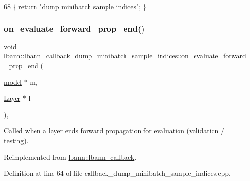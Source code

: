 \begin{DoxyCode}
68 \{ \textcolor{keywordflow}{return} \textcolor{stringliteral}{"dump minibatch sample indices"}; \}
\end{DoxyCode}
\mbox{\label{classlbann_1_1lbann__callback__dump__minibatch__sample__indices_acb641b979a37cc703994103a4e8428a5}} 
\subsubsection{\texorpdfstring{on\+\_\+evaluate\+\_\+forward\+\_\+prop\+\_\+end()}{on\_evaluate\_forward\_prop\_end()}}
{\footnotesize\ttfamily void lbann\+::lbann\+\_\+callback\+\_\+dump\+\_\+minibatch\+\_\+sample\+\_\+indices\+::on\+\_\+evaluate\+\_\+forward\+\_\+prop\+\_\+end (\begin{DoxyParamCaption}\item[{\hyperlink{classlbann_1_1model}{model} $\ast$}]{m,  }\item[{\hyperlink{classlbann_1_1Layer}{Layer} $\ast$}]{l }\end{DoxyParamCaption})\hspace{0.3cm}{\ttfamily [override]}, {\ttfamily [virtual]}}

Called when a layer ends forward propagation for evaluation (validation / testing). 

Reimplemented from \hyperlink{classlbann_1_1lbann__callback_ae23c5a61b81dbdfbd79736ac2b6035aa}{lbann\+::lbann\+\_\+callback}.



Definition at line 64 of file callback\+\_\+dump\+\_\+minibatch\+\_\+sample\+\_\+indices.\+cpp.


